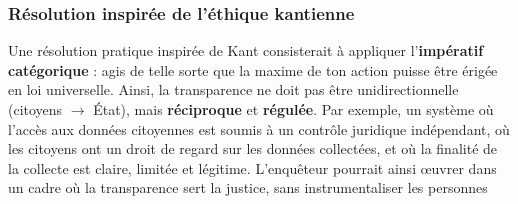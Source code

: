 \documentclass[12pt, a4paper]{article}
\begin{document}
\begin{LARGE}
\subsubsection*{Résolution inspirée de l'éthique kantienne}
Une résolution pratique inspirée de Kant consisterait à appliquer l'\textbf{impératif catégorique} : agis de telle sorte que la maxime de ton action puisse être érigée en loi universelle. Ainsi, la transparence ne doit pas être unidirectionnelle (citoyens $\rightarrow$ État), mais \textbf{réciproque} et \textbf{régulée}. Par exemple, un système où l'accès aux données citoyennes est soumis à un contrôle juridique indépendant, où les citoyens ont un droit de regard sur les données collectées, et où la finalité de la collecte est claire, limitée et légitime. L'enquêteur pourrait ainsi œuvrer dans un cadre où la transparence sert la justice, sans instrumentaliser les personnes

\end{LARGE}
\end{document}
